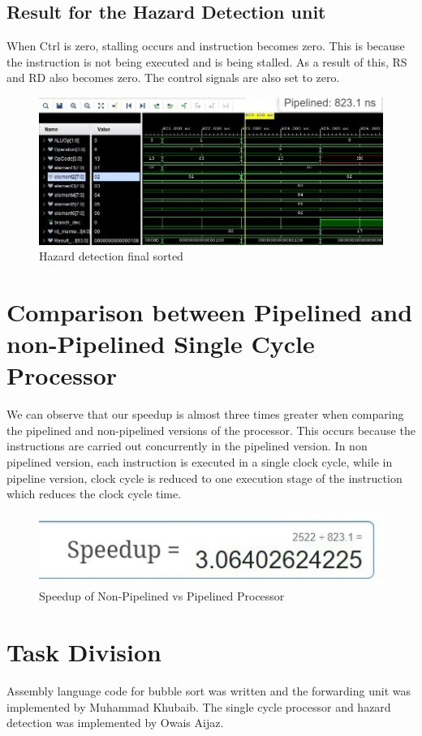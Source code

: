 \documentclass{article}
\begin{document}
\subsection{Result for the Hazard Detection unit}

When Ctrl is zero, stalling occurs and instruction becomes zero. This is because the instruction is not being executed and is being stalled. As a result of this, RS and RD also becomes zero. The control signals are also set to zero.

\begin{figure}[!h]
    \centering
    \includegraphics*[width = 8 cm]{pipeline_sorted.jpeg}
    \caption{Hazard detection final sorted}
    \label{fig:label5}
\end{figure}

\section{Comparison between Pipelined and non-Pipelined Single Cycle Processor}

We can observe that our speedup is almost three times greater when comparing the pipelined and non-pipelined versions of the processor. This occurs because the instructions are carried out concurrently in the pipelined version. In non pipelined version, each instruction is executed in a single clock cycle, while in pipeline version, clock cycle is reduced to one execution stage of the instruction which reduces the clock cycle time.

\begin{figure}[!h]
    \centering
    \includegraphics*[width = 9 cm]{speedup.jpeg}
    \caption{Speedup of Non-Pipelined vs Pipelined Processor}
    \label{fig:label6}
\end{figure}

\section{Task Division}
Assembly language code for bubble sort was written and the forwarding unit was implemented by Muhammad Khubaib.
The single cycle processor and hazard detection was implemented by Owais Aijaz. 
\end{document}
